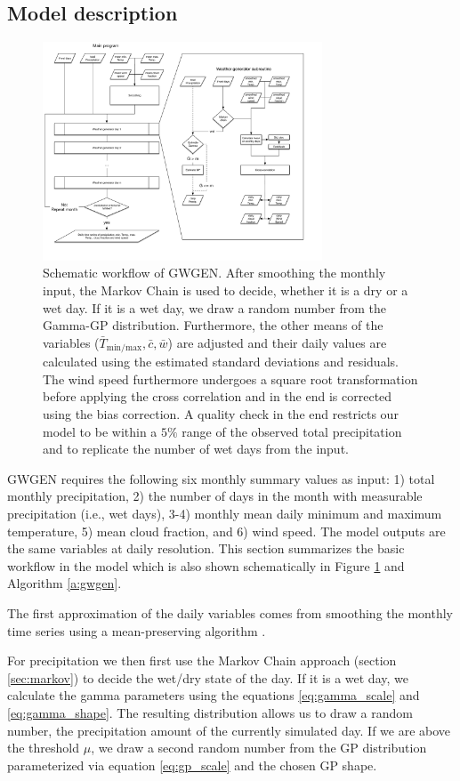 \begin{refsection}
\section{Model description} \label{sec:model}
\begin{figure}
	\includegraphics[width=8.3cm]{gwgen-figures/f01.pdf}
	\caption[Schematic workflow of GWGEN]{Schematic workflow of GWGEN. After smoothing the monthly input, the Markov Chain is used to decide, whether it is a dry or a wet day. If it is a wet day, we draw a random number from the Gamma-GP distribution. Furthermore, the other means of the variables ($\bar{T}_\mathrm{min/max}, \bar{c}, \bar{w}$) are adjusted and their daily values are calculated using the estimated standard deviations and residuals. The wind speed furthermore undergoes a square root transformation before applying the cross correlation and in the end is corrected using the bias correction. A quality check in the end restricts our model to be within a $5\%$ range of the observed total precipitation and to replicate the number of wet days from the input.}
	\label{fig:schema}
\end{figure}
GWGEN requires the following six monthly summary values as input: 1) total monthly precipitation, 2) the number of days in the month with measurable precipitation (i.e., wet days), 3-4) monthly mean daily minimum and maximum temperature, 5) mean cloud fraction, and 6) wind speed. The model outputs are the same variables at daily resolution. This section summarizes the basic workflow in the model which is also shown schematically in Figure \ref{fig:schema} and Algorithm \autoref{a:gwgen}.

The first approximation of the daily variables comes from smoothing the monthly time series using a mean-preserving algorithm \citep{RymesMyers2001}.

For precipitation we then first use the Markov Chain approach (section \ref{sec:markov}) to decide the wet/dry state of the day. If it is a wet day, we calculate the gamma parameters using the equations \eqref{eq:gamma_scale} and \eqref{eq:gamma_shape}. The resulting distribution allows us to draw a random number, the precipitation amount of the currently simulated day. If we are above the threshold $\mu$, we draw a second random number from the GP distribution parameterized via equation \eqref{eq:gp_scale} and the chosen GP shape.


\end{refsection}
